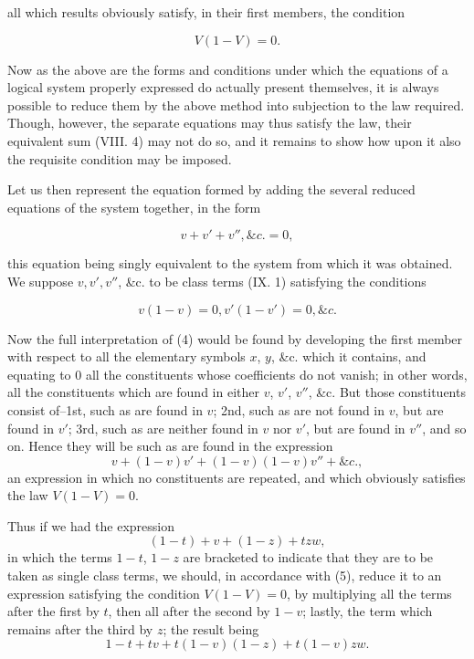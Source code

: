 \documentclass[oneside]{book}
\begin{document}
all which results obviously satisfy, in their first members, the
condition

\[
V(1-V) = 0.
\]

Now as the above are the forms and conditions under which the
equations of a logical system properly expressed do actually
present themselves, it is always possible to reduce them by the
above method into subjection to the law required. Though,
however, the separate equations may thus satisfy the law, their
equivalent sum (VIII. 4) may not do so, and it remains to
show how upon it also the requisite condition may be imposed.

Let us then represent the equation formed by adding the
several reduced equations of the system together, in the form

\begin{equation}
v + v' + v'', \&c. = 0,
\end{equation}

this equation being singly equivalent to the system from which
it was obtained. We suppose $v, v', v''$, \&c. to be class terms
(IX. 1) satisfying the conditions

\[
v(1-v) = 0, v'(1-v') = 0, \&c.
\]

Now the full interpretation of (4) would be found by developing
the first member with respect to all the elementary symbols
$x$, $y$, \&c. which it contains, and equating to 0 all the constituents
whose coefficients do not vanish; in other words, all the constituents
which are found in either $v$, $v'$, $v''$, \&c. But those constituents
consist of--1st, such as are found in $v$; 2nd, such as are
not found in $v$, but are found in $v'$; 3rd, such as are neither found
in $v$ nor $v'$, but are found in $v''$, and so on. Hence they will be
such as are found in the expression
\begin{equation}
v + (1 - v)v' + (1 - v)(1 - v)v''+ \&c.,
\end{equation}
an expression in which no constituents are repeated, and which
obviously satisfies the law $V(1-V)=0$.

Thus if we had the expression
\[
(1 - t) + v + (1 - z) + tzw,
\]
in which the terms $1-t$, $1-z$ are bracketed to indicate that they
are to be taken as single class terms, we should, in accordance
with (5), reduce it to an expression satisfying the condition
$V(1-V)=0$, by multiplying all the terms after the first by $t$,
then all after the second by $1-v$; lastly, the term which remains
after the third by $z$; the result being
\begin{equation}
1 - t + tv + t(1 - v)(1 - z) + t(1 - v)zw.
\end{equation}
\end{document}
